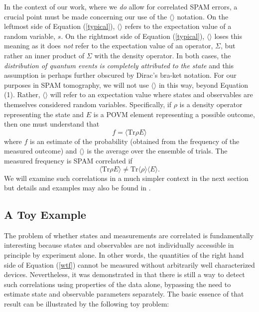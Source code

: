 \documentclass[pra, 10pt, notitlepage, twocolumn]{revtex4-1}
\newcommand{\pref}[1]{(\ref{#1})}
\begin{document}
In the context of our work, where we \emph{do} allow for correlated SPAM errors, a crucial point must be made concerning our use of the $\langle\rangle$ notation.
On the leftmost side of Equation (\ref{typical}), $\langle\rangle$ refers to the expectation value of a random variable, $s$.
On the rightmost side of Equation (\ref{typical}), $\langle\rangle$ loses this meaning as it does \emph{not} refer to the expectation value of an operator, $\Sigma$, but rather an inner product of $\Sigma$ with the density operator.
In both cases, the \emph{distribution of quantum events is completely attributed to the state} and this assumption is perhaps further obscured by Dirac's bra-ket notation.
For our purposes in SPAM tomography, we will not use $\langle\rangle$ in this way, beyond Equation (1).
Rather, $\langle\rangle$ will refer to an expectation value where states and observables are themselves considered random variables.
Specifically, if $\rho$ is a density operator representing the state and $E$ is a POVM element representing a possible outcome, then one must understand that
\begin{equation}
	f = \langle\mathrm{Tr}\rho E\rangle
\end{equation}
where $f$ is an estimate of the probability (obtained from the frequency of the measured outcome) and $\langle\rangle$ is the average over the ensemble of trials.
The measured frequency is SPAM correlated if
\begin{equation}\label{wtf}
	\langle\mathrm{Tr}\rho E\rangle \neq \mathrm{Tr} \langle \rho \rangle \langle E \rangle.
\end{equation}
We will examine such correlations in a much simpler context in the next section but details and examples may also be found in \cite{jackson2015detecting}.




\subsection{A Toy Example}\label{toy}


The problem of whether states and measurements are correlated is fundamentally interesting
because states and observables are not individually accessible in principle by experiment alone.
In other words, the quantities of the right hand side of Equation \pref{wtf} cannot be measured without arbitrarily well characterized devices.
Nevertheless, it was demonstrated in \cite{jackson2015detecting} that there is still a way to detect such correlations using properties of the data alone,
bypassing the need to estimate state and observable parameters separately.
The basic essence of that result can be illustrated by the following toy problem:
\end{document}
